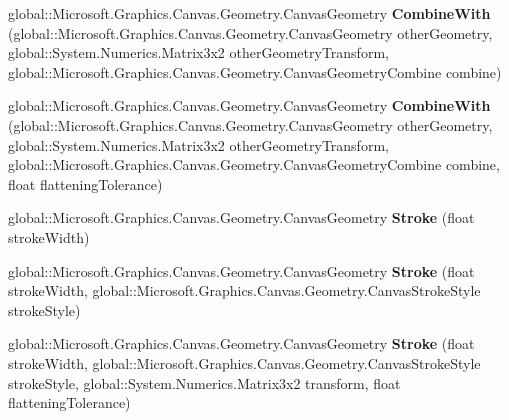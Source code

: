 \begin{DoxyCompactItemize}
\mbox{\label{interface_microsoft_1_1_graphics_1_1_canvas_1_1_geometry_1_1_i_canvas_geometry_a6815c1deb8e9baa248c965b9a8f12fe7}} 
global\+::\+Microsoft.\+Graphics.\+Canvas.\+Geometry.\+Canvas\+Geometry {\bfseries Combine\+With} (global\+::\+Microsoft.\+Graphics.\+Canvas.\+Geometry.\+Canvas\+Geometry other\+Geometry, global\+::\+System.\+Numerics.\+Matrix3x2 other\+Geometry\+Transform, global\+::\+Microsoft.\+Graphics.\+Canvas.\+Geometry.\+Canvas\+Geometry\+Combine combine)
\item 
\mbox{\label{interface_microsoft_1_1_graphics_1_1_canvas_1_1_geometry_1_1_i_canvas_geometry_a9dbfa5fa955580afeef0c2a26e0281b9}} 
global\+::\+Microsoft.\+Graphics.\+Canvas.\+Geometry.\+Canvas\+Geometry {\bfseries Combine\+With} (global\+::\+Microsoft.\+Graphics.\+Canvas.\+Geometry.\+Canvas\+Geometry other\+Geometry, global\+::\+System.\+Numerics.\+Matrix3x2 other\+Geometry\+Transform, global\+::\+Microsoft.\+Graphics.\+Canvas.\+Geometry.\+Canvas\+Geometry\+Combine combine, float flattening\+Tolerance)
\item 
\mbox{\label{interface_microsoft_1_1_graphics_1_1_canvas_1_1_geometry_1_1_i_canvas_geometry_a9bbabef2bcb23c5f82d026f2b161dac4}} 
global\+::\+Microsoft.\+Graphics.\+Canvas.\+Geometry.\+Canvas\+Geometry {\bfseries Stroke} (float stroke\+Width)
\item 
\mbox{\label{interface_microsoft_1_1_graphics_1_1_canvas_1_1_geometry_1_1_i_canvas_geometry_a6ddac698f9eed90fcbbee6f511c98099}} 
global\+::\+Microsoft.\+Graphics.\+Canvas.\+Geometry.\+Canvas\+Geometry {\bfseries Stroke} (float stroke\+Width, global\+::\+Microsoft.\+Graphics.\+Canvas.\+Geometry.\+Canvas\+Stroke\+Style stroke\+Style)
\item 
\mbox{\label{interface_microsoft_1_1_graphics_1_1_canvas_1_1_geometry_1_1_i_canvas_geometry_ac124844233277683b138a1178fe818ad}} 
global\+::\+Microsoft.\+Graphics.\+Canvas.\+Geometry.\+Canvas\+Geometry {\bfseries Stroke} (float stroke\+Width, global\+::\+Microsoft.\+Graphics.\+Canvas.\+Geometry.\+Canvas\+Stroke\+Style stroke\+Style, global\+::\+System.\+Numerics.\+Matrix3x2 transform, float flattening\+Tolerance)

\end{DoxyCompactItemize}
